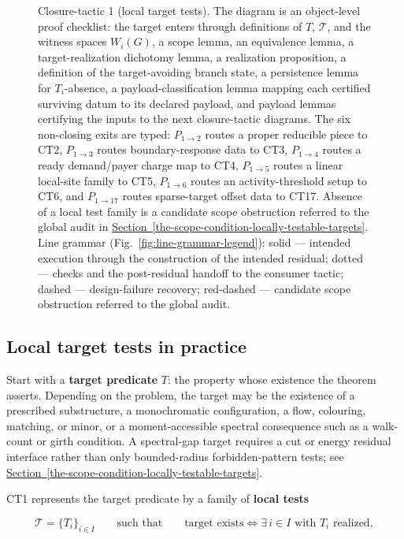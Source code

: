 \documentclass[
  11pt,
]{article}
\theoremstyle{definition}
\newcommand{\secref}[1]{\hyperref[#1]{Section~\ref*{#1}}}
\begin{document}
\begin{figure}[p]
{}
\caption[Closure-tactic 1: local target tests]{Closure-tactic 1 (local target tests).  The diagram is an object-level proof checklist: the target enters through definitions of \(T\), \(\mathcal T\), and the witness spaces \(W_i(G)\), a scope lemma, an equivalence lemma, a target-realization dichotomy lemma, a realization proposition, a definition of the target-avoiding branch state, a persistence lemma for \(T_i\)-absence, a payload-classification lemma mapping each certified surviving datum to its declared payload, and payload lemmas certifying the inputs to the next closure-tactic diagrams.  The six non-closing exits are typed: \(P_{1\to2}\) routes a proper reducible piece to CT2, \(P_{1\to3}\) routes boundary-response data to CT3, \(P_{1\to4}\) routes a ready demand/payer charge map to CT4, \(P_{1\to5}\) routes a linear local-site family to CT5, \(P_{1\to6}\) routes an activity-threshold setup to CT6, and \(P_{1\to17}\) routes sparse-target offset data to CT17.  Absence of a local test family is a candidate scope obstruction referred to the global audit in \secref{the-scope-condition-locally-testable-targets}.  Line grammar (Fig.~\ref{fig:line-grammar-legend}): solid --- intended execution through the construction of the intended residual; dotted --- checks and the post-residual handoff to the consumer tactic; dashed --- design-failure recovery; red-dashed --- candidate scope obstruction referred to the global audit.}
\label{fig:ct1-local-target-tests}
\end{figure}
\FloatBarrier

\subsection*{Local target tests in practice}

Start with a \textbf{target predicate} \(T\): the property whose
existence the theorem asserts. Depending on the problem, the target may
be the existence of a prescribed substructure, a monochromatic
configuration, a flow, colouring, matching, or minor, or a
moment-accessible spectral consequence such as a walk-count or girth
condition. A spectral-gap target requires a cut or energy residual
interface rather than only bounded-radius forbidden-pattern tests; see
\secref{the-scope-condition-locally-testable-targets}.

CT1 represents the target predicate by a family of
\textbf{local tests}

\[
\mathcal T = \{T_i\}_{i\in I}
\qquad\text{such that}\qquad
\text{target exists} \iff \exists\, i \in I \text{ with } T_i \text{ realized},
\]
\end{document}
